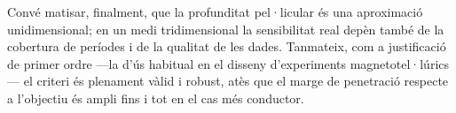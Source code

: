 Convé matisar, finalment, que la profunditat pel·licular és una aproximació
unidimensional; en un medi tridimensional la sensibilitat real depèn també de la
cobertura de períodes i de la qualitat de les dades. Tanmateix, com a justificació de
primer ordre —la d'ús habitual en el disseny d'experiments magnetotel·lúrics— el
criteri és plenament vàlid i robust, atès que el marge de penetració respecte a
l'objectiu és ampli fins i tot en el cas més conductor.
